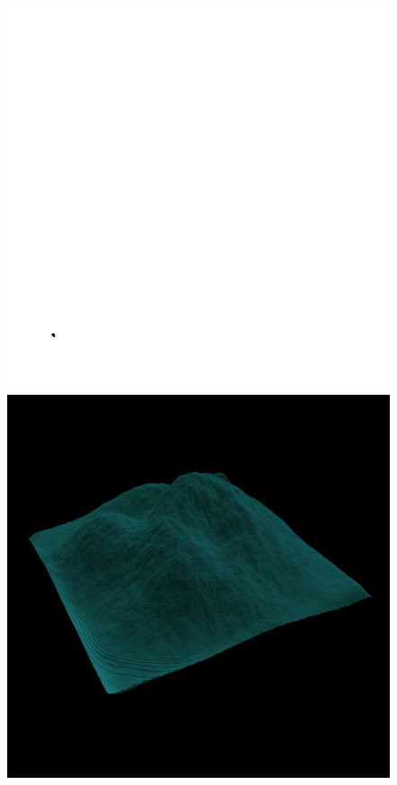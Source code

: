 	\begin{figure}[H]
	  \centering
	  \includegraphics[width=\imagewidth]{images/results/terrains/512-1/perlin/480}
	  \includegraphics[width=\imagewidth]{images/results/terrains/512-1/perlin/480_3d}

\end{figure}
